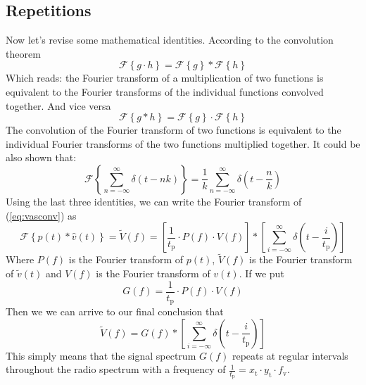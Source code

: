 \documentclass[a4paper,12pt,twoside,openright]{report}
\begin{document}
\subsection{Repetitions}
Now let's revise some mathematical identities. According to the convolution theorem \cite{arfkenconvolution}
\begin{equation}
\mathcal{F} \left\{ g \cdot h \right\} = \mathcal{F} \left\{ g \right\} \ast  \mathcal{F} \left\{ h \right\}
\end{equation}
Which reads: the Fourier transform of a multiplication of two functions is equivalent to the Fourier transforms of the individual functions convolved together. And vice versa
\begin{equation}
\mathcal{F} \left\{ g \ast h \right\} = \mathcal{F} \left\{ g \right\} \cdot  \mathcal{F} \left\{ h \right\}
\end{equation}
The convolution of the Fourier transform of two functions is equivalent to the individual Fourier transforms of the two functions multiplied together.
It could be also shown that:
\begin{equation}
\mathcal{F} \left\{ \sum\limits_{n=-\infty}^{\infty}  \delta(t-n k) \right\} = \frac{1}{k} \sum\limits_{n=-\infty}^{\infty}  \delta \left( t-\frac{n}{k} \right)
\end{equation}
Using the last three identities, we can write the Fourier transform of (\ref{eq:vasconv}) as
\begin{equation} 
\mathcal{F} \left\{ p(t) \ast \hat{v}(t) \right\} = \tilde{V}(f) =
\left[ \frac{1}{t_\text{p}} \cdot P(f) \cdot V(f) \right] \ast
\left[ \sum\limits_{i=-\infty}^{\infty}  \delta \left( t-\frac{i}{t_\text{p}} \right) \right]
\end{equation}
Where $P(f)$ is the Fourier transform of $p(t)$, $\tilde{V}(f)$ is the Fourier transform of $\tilde{v}(t)$ and $V(f)$ is the Fourier transform of $v(t)$. If we put 
\begin{equation} 
\label{eq:gfdef}
G(f) = \frac{1}{t_\text{p}} \cdot P(f) \cdot V(f)
\end{equation}
Then we we can arrive to our final conclusion that
\begin{equation}
\label{eq:vspectrum}
\tilde{V}(f) = G(f) \ast
\left[ \sum\limits_{i=-\infty}^{\infty}  \delta \left( t-\frac{i}{t_\text{p}} \right) \right]
\end{equation}
This simply means that the signal spectrum $G(f)$ repeats at regular intervals throughout the radio spectrum with a frequency of $\frac{1}{t_\text{p}} = x_\text{t} \cdot y_\text{t} \cdot f_\text{v}$.
\end{document}
